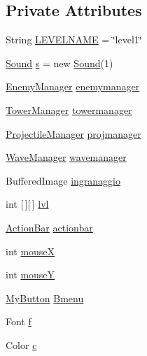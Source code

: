 \subsection*{Private Attributes}
\begin{DoxyCompactItemize}
\item 
String \hyperlink{classscenes_1_1_level1_a4965d4285aad63d850d0917b23e3f11f}{L\+E\+V\+E\+L\+N\+A\+ME} = \char`\"{}level1\char`\"{}
\item 
\hyperlink{classprogetto_1_1_sound}{Sound} \hyperlink{classscenes_1_1_level1_a76e9e53c877d84187e0efb78f03c86d4}{s} = new \hyperlink{classprogetto_1_1_sound}{Sound}(1)
\item 
\hyperlink{classmanagers_1_1_enemy_manager}{Enemy\+Manager} \hyperlink{classscenes_1_1_level1_a1f593b74cc45d79b21ce59953aa8118f}{enemymanager}
\item 
\hyperlink{classmanagers_1_1_tower_manager}{Tower\+Manager} \hyperlink{classscenes_1_1_level1_a1340930f4499459346af3af2d24e3d3e}{towermanager}
\item 
\hyperlink{classmanagers_1_1_projectile_manager}{Projectile\+Manager} \hyperlink{classscenes_1_1_level1_aee34cf906685787259a2edd7d4559863}{projmanager}
\item 
\hyperlink{classmanagers_1_1_wave_manager}{Wave\+Manager} \hyperlink{classscenes_1_1_level1_a53367ff9cb3d994463429a1103e0ce6a}{wavemanager}
\item 
Buffered\+Image \hyperlink{classscenes_1_1_level1_ab0c4ea45989823c211fa4034d743f36b}{ingranaggio}
\item 
int \mbox{[}$\,$\mbox{]}\mbox{[}$\,$\mbox{]} \hyperlink{classscenes_1_1_level1_a4b06a2210cf5b93dda77f2a9a061d538}{lvl}
\item 
\hyperlink{classui_1_1_action_bar}{Action\+Bar} \hyperlink{classscenes_1_1_level1_aa73d545c6ea02ea24a244ba02a329b28}{actionbar}
\item 
int \hyperlink{classscenes_1_1_level1_a85ea1b63086b31a15d3ed2579c5715a6}{mouseX}
\item 
int \hyperlink{classscenes_1_1_level1_a3637abebcaa9d04aa18b1610d0921e16}{mouseY}
\item 
\hyperlink{classui_1_1_my_button}{My\+Button} \hyperlink{classscenes_1_1_level1_a3bcc199bdb1d50c111054398694c7473}{Bmenu}
\item 
Font \hyperlink{classscenes_1_1_level1_a3fb562f10e8f7f83cb2ed130eab6d439}{f}
\item 
Color \hyperlink{classscenes_1_1_level1_a02094092ae89aa4b23bff1976bcbf90d}{c}
\item 

\end{DoxyCompactItemize}
